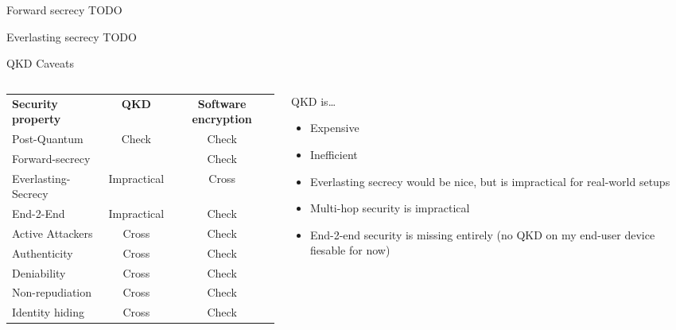 \begin{frame}{Forward secrecy}
  TODO
\end{frame}

\begin{frame}{Everlasting secrecy}
  TODO
\end{frame}

\begin{frame}{QKD Caveats}
  \begin{columns}
    \begin{column}{.4\textwidth}

      \begin{tabular}{ l c c }
        \textbf{Security property} & \textbf{QKD} & \textbf{Software encryption} \\

        Post-Quantum        & Check           & Check           \\
        Forward-secrecy     &                 & Check           \\
        Everlasting-Secrecy & Impractical     & Cross           \\
        End-2-End           & Impractical     & Check           \\
        Active Attackers    & Cross           & Check           \\
        Authenticity        & Cross           & Check           \\
        Deniability         & Cross           & Check           \\
        Non-repudiation     & Cross           & Check           \\
        Identity hiding     & Cross           & Check           \\
      \end{tabular}
    \end{column}
    \begin{column}{.6\textwidth}
      QKD is…

      \begin{itemize}
        \item Expensive
        \item Inefficient
        \item Everlasting secrecy would be nice, but is impractical for real-world setups
        \item Multi-hop security is impractical
        \item End-2-end security is missing entirely (no QKD on my end-user device fiesable for now)
      \end{itemize}
    \end{column}
  \end{columns}
\end{frame}
